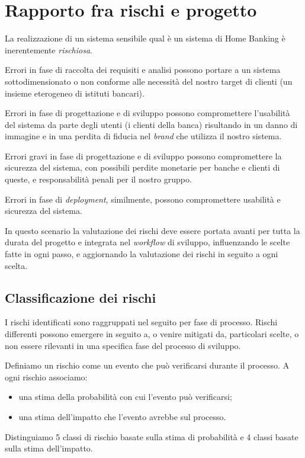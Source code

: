 \section{Rapporto fra rischi e progetto}

La realizzazione di un sistema sensibile qual \`e un sistema di Home Banking \`e inerentemente \emph{rischiosa}.

Errori in fase di raccolta dei requisiti e analisi possono portare a un sistema sottodimensionato o non conforme alle necessit\`a del nostro target di clienti (un insieme eterogeneo di istituti bancari).

Errori in fase di progettazione e di sviluppo possono compromettere l'usabilit\`a del sistema da parte degli utenti (i clienti della banca) risultando in un danno di immagine e in una perdita di fiducia nel \emph{brand} che utilizza il nostro sistema.

Errori gravi in fase di progettazione e di sviluppo possono compromettere la sicurezza del sistema, con possibili perdite monetarie per banche e clienti di queste, e responsabilit\`a penali per il nostro gruppo.

Errori in fase di \emph{deployment}, similmente, possono compromettere usabilit\`a e sicurezza del sistema.

In questo scenario la valutazione dei rischi deve essere portata avanti per tutta la durata del progetto e integrata nel \emph{workflow} di sviluppo, influenzando le scelte fatte in ogni passo, e aggiornando la valutazione dei rischi in seguito a ogni scelta.

\subsection{Classificazione dei rischi}

I rischi identificati sono raggruppati nel seguito per fase di processo.
Rischi differenti possono emergere in seguito a, o venire mitigati da, particolari scelte, o non essere rilevanti in una specifica fase del processo di sviluppo.

Definiamo un rischio come un evento che pu\`o verificarsi durante il processo.
A ogni rischio associamo:
\begin{itemize}
	\item una stima della probabilit\`a con cui l'evento pu\`o verificarsi;
	\item una stima dell'impatto che l'evento avrebbe sul processo.
\end{itemize}
Distinguiamo 5 classi di rischio basate sulla stima di probabilit\`a e 4 classi basate sulla stima dell'impatto.


